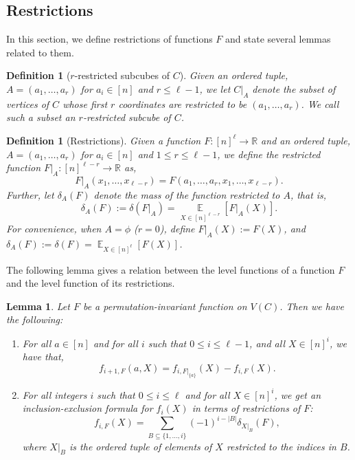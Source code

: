 \documentclass[11pt]{article}
\DeclareMathOperator*{\E}{\mathbb{E}}
\def \R {\mathbb{R}}
\newtheorem{lemma}[theorem]{Lemma}
\newtheorem{definition}[theorem]{Definition}
\theoremstyle{definition}
\begin{document}
\subsection{Restrictions}
In this section, we define restrictions of functions $F$ and state several lemmas related to them.
\begin{definition}[$r$-restricted subcubes of $C$]
Given an ordered tuple, $A = (a_1,\ldots,a_r)$ for $a_i \in [n]$ and $r \leq \ell-1$, we let $C|_{A}$ denote the subset of vertices of $C$ whose first $r$ coordinates are restricted to be $(a_1,\ldots,a_r)$. We call such a subset an $r$-restricted subcube of $C$.
\end{definition}


\begin{definition}[Restrictions]
Given a function $F:[n]^\ell \rightarrow \R$ and an ordered tuple, $A = (a_1,\ldots,a_r)$ for $a_i \in [n]$ and $1 \leq r \leq \ell-1$, we define the restricted function $F|_A: [n]^{\ell - r} \rightarrow \R$ as, 
$$F|_A(x_1,\ldots,x_{\ell-r}) = F(a_1,\ldots,a_r, x_1,\ldots,x_{\ell-r}).$$
Further, let $\delta_A(F)$ denote the mass of the function restricted to $A$, that is,
$$\delta_A(F) := \delta(F|_A) = \E\limits_{X \in [n]^{\ell - r}}[F|_A(X)].$$
For convenience, when $A = \phi$ ($r = 0$), define $F|_A(X) := F(X)$, and $\delta_A(F) := \delta(F) = \E_{X \in [n]^\ell}[F(X)]$.
\end{definition}



The following lemma gives a relation between the level functions of a function $F$ and the level function of its restrictions.
\begin{lemma}\label{lem:restriction}
Let $F$ be a permutation-invariant function on $V(C)$. Then we have the following:
\begin{enumerate}
\item For all $a \in [n]$ and for all $i$ such that $0 \leq i \leq \ell-1$, and all $X \in [n]^i$, we have that,
\[f_{i+1,F}(a, X) = f_{i,F|_{\{a\}}}(X) - f_{i,F}(X).\]

\item For all integers $i$ such that $0 \leq i \leq \ell$ and for all $X \in [n]^i$, we get an inclusion-exclusion formula for $f_i(X)$ in terms of restrictions of $F$: 
\[f_{i,F}(X) = \sum_{B \subseteq \{1,\ldots,i\}} (-1)^{i - |B|} \delta_{X|_B}(F),\]
where $X|_B$ is the ordered tuple of elements of $X$ restricted to the indices in $B$.
\end{enumerate}
\end{lemma}
\end{document}
